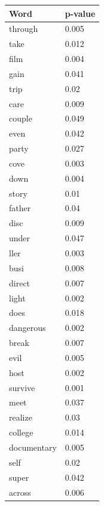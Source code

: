 \documentclass[12pt, oneside]{article}   	%
\begin{document}
\begin{table}[H]
\begin{tabular}[t]{l|l}
\end{tabular}
\begin{tabular}[t]{l|l}
\textbf{Word}        & \textbf{p-value} \\ \hline
through     & 0.005    \\
take        & 0.012    \\
film        & 0.004    \\
gain        & 0.041    \\
trip        & 0.02     \\
care        & 0.009    \\
couple      & 0.049    \\
even        & 0.042    \\
party       & 0.027    \\
cove        & 0.003    \\
down        & 0.004    \\
story       & 0.01     \\
father      & 0.04     \\
disc        & 0.009    \\
under       & 0.047    \\
ller        & 0.003    \\
busi        & 0.008    \\
direct      & 0.007    \\
light       & 0.002    \\
does        & 0.018    \\
dangerous   & 0.002    \\
break       & 0.007    \\
evil        & 0.005    \\
host        & 0.002    \\
survive     & 0.001    \\
meet        & 0.037    \\
realize     & 0.03     \\
college     & 0.014    \\
documentary & 0.005    \\
self        & 0.02     \\
super       & 0.042    \\
across      & 0.006    \\
\end{tabular}

\end{table}
\end{document}
